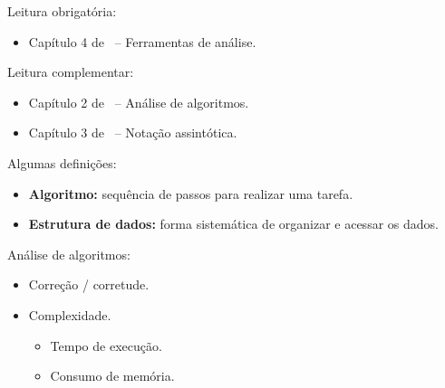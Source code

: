 \newcommand{\defs}{../defs}


\newcommand{\content}{Complexidade de algoritmos}
\newcommand{\class}{Algoritmos e Estruturas de Dados}
\newcommand{\shortcourse}{45EST}



\makeheader

{
Leitura obrigatória:
\begin{itemize}
	\item Capítulo 4 de~\cite{GoodrichAndTamassia2013} -- Ferramentas de análise.
\end{itemize}

Leitura complementar:
\begin{itemize}
	\item Capítulo 2 de~\cite{Preiss2001} -- Análise de algoritmos.
	\item Capítulo 3 de~\cite{Preiss2001} -- Notação assintótica.
\end{itemize}
}

\medskip


Algumas definições:
\begin{itemize}
	\item \textbf{Algoritmo:} sequência de passos para realizar uma tarefa.
	\item \textbf{Estrutura de dados:} forma sistemática de organizar e acessar os dados.
\end{itemize}


Análise de algoritmos:
\begin{itemize}
	\item Correção / corretude.
	\item Complexidade.
	\begin{itemize}
		\item Tempo de execução.
		\item Consumo de memória.
	\end{itemize}
\end{itemize}

\medskip

%

